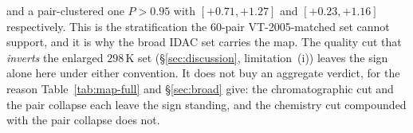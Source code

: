 and a pair-clustered one $P>0.95$ with $[+0.71,+1.27]$ and $[+0.23,+1.16]$ respectively.
This is the stratification the $60$-pair VT-2005-matched set cannot support, and it is why the
broad IDAC set carries the map. The quality cut that \emph{inverts} the enlarged $298$\,K set
(\S\ref{sec:discussion}, limitation~(i)) leaves the sign alone here under either convention. It
does not buy an aggregate verdict, for the reason Table~\ref{tab:map-full} and \S\ref{sec:broad}
give: the chromatographic cut and the pair collapse each leave the sign standing, and the chemistry
cut compounded with the pair collapse does not.
\begin{table}[tp]
\centering
\caption{Solubility accuracy in two blocks that may not be read across: this work on the
solute-scaffold split, external models re-run here on an easier by-solute split. Two sample sizes
appear where a row's two metric columns are scored on different rows, one where they coincide. The
grounded, ungrounded and $\sigma$-oracle arms of the first block come from the five-seed leak-free
re-run.}
\label{tab:baselines}
{\footnotesize
\renewcommand{\arraystretch}{0.95}
}
\end{table}

